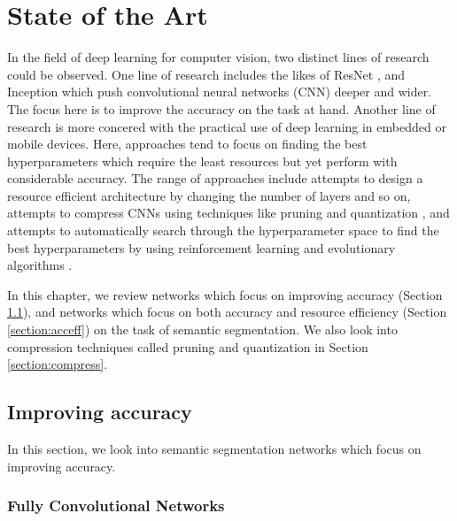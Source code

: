 
\chapter{State of the Art}

In the field of deep learning for computer vision, two distinct lines of research could be observed. One line of research includes the likes of ResNet \cite{DBLP:journals/corr/HeZRS15}, and Inception \cite{DBLP:journals/corr/SzegedyLJSRAEVR14} which push convolutional neural networks (CNN) deeper and wider. The focus here is to improve the accuracy on the task at hand. Another line of research is more concered with the practical use of deep learning in embedded or mobile devices. Here, approaches tend to focus on finding the best hyperparameters which require the least resources but yet perform with considerable accuracy. The range of approaches include attempts to design a resource efficient architecture by changing the number of layers and so on, attempts to compress CNNs using techniques like pruning \cite{DBLP:journals/corr/MolchanovTKAK16} and quantization \cite{DBLP:journals/corr/WuLWHC15}, and attempts to automatically search through the hyperparameter space to find the best hyperparameters by using reinforcement learning \cite{DBLP:journals/corr/ZophL16} and evolutionary algorithms \cite{DBLP:journals/corr/abs-1802-01548}. 

In this chapter, we review networks which focus on improving accuracy (Section \ref{section:impacc}), and networks which focus on both accuracy and resource efficiency (Section \ref{section:acceff}) on the task of semantic segmentation. We also look into compression techniques called pruning and quantization in Section \ref{section:compress}.



\section{Improving accuracy}
\label{section:impacc}

In this section, we look into semantic segmentation networks which focus on improving accuracy. 

\subsection{Fully Convolutional Networks}

